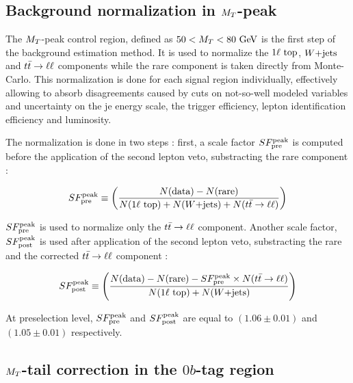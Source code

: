         \subsection{Background normalization in $M_T$-peak \label{sec:MTpeakNormalization}}

            The $M_T$-peak control region, defined as $50 < M_T < 80 ~\text{GeV}$ is the first step of the
            background estimation method. It is used to normalize the $1\ell~\text{top}$, $\text{$W$+jets}$ and
            $t\bar{t} \rightarrow \ell \ell$ components while the rare component is taken directly from Monte-Carlo.
            This normalization is done for each signal region individually, effectively allowing to
            absorb disagreements caused by cuts on not-so-well modeled variables and uncertainty on the
            je energy scale, the trigger efficiency, lepton identification efficiency and luminosity.

            The normalization is done in two steps : first, a scale factor $SF_{\text{pre}}^{\text{peak}}$ is
            computed before the application of the second lepton veto, substracting the rare component :

            \begin{equation}
                SF_{\text{pre}}^{\text{peak}} \equiv \left( \frac{N(\text{data}) - N(\text{rare})}{N(1\ell~\text{top}) + N(\text{$W$+jets}) + N(t\bar{t} \rightarrow \ell \ell)} \right)
                \label{eq:SFpreDefinition}
            \end{equation}

            $SF_{\text{pre}}^{\text{peak}}$ is used to normalize only the $t\bar{t} \rightarrow \ell \ell$ component. Another scale factor, $SF_{\text{post}}^{\text{peak}}$ is used after application of the second lepton veto, substracting the rare and the corrected $t\bar{t} \rightarrow \ell \ell$ component :

            \begin{equation}
                SF_{\text{post}}^{\text{peak}} \equiv \left( \frac{N(\text{data}) - N(\text{rare}) - SF_{\text{pre}}^{\text{peak}} \times N(t\bar{t} \rightarrow \ell \ell)}{N(1\ell~\text{top}) + N(\text{$W$+jets})} \right)
                \label{eq:SFpostDefinition}
            \end{equation}

            At preselection level, $SF_{\text{pre}}^{\text{peak}}$ and $SF_{\text{post}}^{\text{peak}}$ are equal to $(1.06 \pm 0.01)$ and $(1.05 \pm 0.01)$ respectively.

        \subsection{$M_T$-tail correction in the $0b$-tag region \label{sec:MTtailCorrection}}

